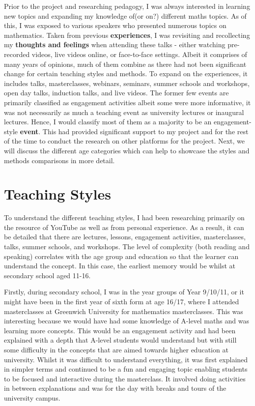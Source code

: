 \documentclass[12pt, a4paper,oneside]{book}
\numberwithin{equation}{section}
\begin{document}
Prior to the project and researching pedagogy, I was always interested in learning new topics and expanding my knowledge of(or on?) different maths topics. As of this, I was exposed to various speakers who presented numerous topics on mathematics. Taken from previous {\color{red}\textbf{experiences}}, I was revisiting and recollecting my {\color{red}\textbf{thoughts and feelings}} when attending these talks - either watching pre-recorded videos, live videos online, or face-to-face settings. Albeit it comprises of many years of opinions, much of them combine as there had not been significant change for certain teaching styles and methods. To expand on the experiences, it includes talks, masterclasses, webinars, seminars, summer schools and workshops, open day talks, induction talks, and live videos. The former few events are primarily classified as engagement activities albeit some were more informative, it was not necessarily as much a teaching event as university lectures or inaugural lectures. Hence, I would classify most of them as a majority to be an engagement-style {\color{red}\textbf{event}}. This had provided significant support to my project and for the rest of the time to conduct the research on other platforms for the project. Next, we will discuss the different age categories which can help to showcase the styles and methods comparisons in more detail.

\section{Teaching Styles}\label{sec:2.1}
 To understand the different teaching styles, I had been researching primarily on the resource of YouTube as well as from personal experience. As a result, it can be detailed that there are lectures, lessons, engagement activities, masterclasses, talks, summer schools, and workshops. The level of complexity (both reading and speaking) correlates with the age group and education so that the learner can understand the concept. In this case, the earliest memory would be whilst at secondary school aged 11-16.

 Firstly, during secondary school, I was in the year groups of Year 9/10/11, or it might have been in the first year of sixth form at age 16/17, where I attended masterclasses at Greenwich University for mathematics masterclasses. This was interesting because we would have had some knowledge of A-level maths and was learning more concepts. This would be an engagement activity and had been explained with a depth that A-level students would understand but with still some difficulty in the concepts that are aimed towards higher education at university. Whilst it was difficult to understand everything, it was first explained in simpler terms and continued to be a fun and engaging topic enabling students to be focused and interactive during the masterclass. It involved doing activities in between explanations and was for the day with breaks and tours of the university campus.
\end{document}
